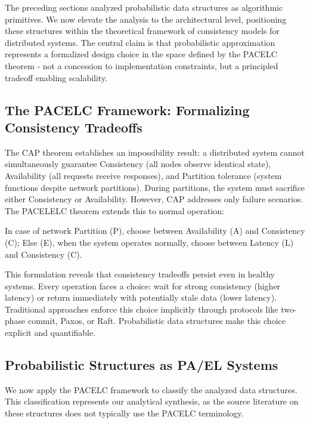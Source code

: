 The preceding sections analyzed probabilistic data structures as algorithmic primitives. We now elevate the analysis to the architectural level, positioning these structures within the theoretical framework of consistency models for distributed systems. The central claim is that probabilistic approximation represents a formalized design choice in the space defined by the PACELC theorem - not a concession to implementation constraints, but a principled tradeoff enabling scalability.

\subsection{The PACELC Framework: Formalizing Consistency Tradeoffs}

The CAP theorem establishes an impossibility result: a distributed system cannot simultaneously guarantee Consistency (all nodes observe identical state), Availability (all requests receive responses), and Partition tolerance (system functions despite network partitions). During partitions, the system must sacrifice either Consistency or Availability. However, CAP addresses only failure scenarios. The PACELELC theorem extends this to normal operation:

\begin{theorem}
    In case of network Partition (P), choose between Availability (A) and Consistency (C); Else (E), when the system operates normally, choose between Latency (L) and Consistency (C).
\end{theorem}

This formulation reveals that consistency tradeoffs persist even in healthy systems. Every operation faces a choice: wait for strong consistency (higher latency) or return immediately with potentially stale data (lower latency). Traditional approaches enforce this choice implicitly through protocols like two-phase commit, Paxos, or Raft. Probabilistic data structures make this choice explicit and quantifiable.

\subsection{Probabilistic Structures as PA/EL Systems}

We now apply the PACELC framework to classify the analyzed data structures. This classification represents our analytical synthesis, as the source literature on these structures does not typically use the PACELC terminology.


